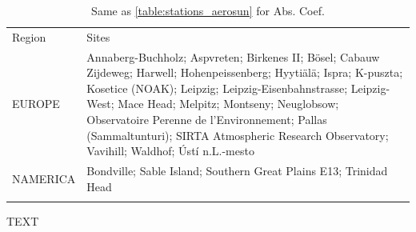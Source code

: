\documentclass[journal abbreviation, manuscript]{copernicus}
\begin{document}
\begin{table}
 \scriptsize
 \begin{tabularx}{\textwidth}{lX}
  \tophline
  Region   & Sites                                                                                                                                                                                                                                                                                                                                                                            \\
  \middlehline
  EUROPE   & Annaberg-Buchholz; Aspvreten; Birkenes II; Bösel; Cabauw Zijdeweg; Harwell; Hohenpeissenberg; Hyytiälä; Ispra; K-puszta; Kosetice (NOAK); Leipzig; Leipzig-Eisenbahnstrasse; Leipzig-West; Mace Head; Melpitz; Montseny; Neuglobsow; Observatoire Perenne de l'Environnement; Pallas (Sammaltunturi); SIRTA Atmospheric Research Observatory; Vavihill; Waldhof; Ústí n.L.-mesto \\
  NAMERICA & Bondville; Sable Island; Southern Great Plains E13; Trinidad Head                                                                                                                                                                                                                                                                                                                \\
  \bottomhline
 \end{tabularx}
 \caption{Same as \ref{table:stations_aerosun} for Abs. Coef.}
 \label{table:stations_abs}
\end{table}





\begin{acknowledgements}
 TEXT
\end{acknowledgements}








\end{document}
